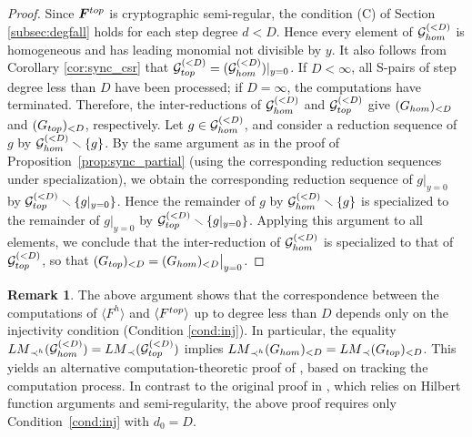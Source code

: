 \documentclass{article}
\theoremstyle{definition}
\newtheorem{remark}[theorem]{Remark}
\theoremstyle{plain}
\theoremstyle{plain}
\theoremstyle{plain}
\theoremstyle{plain}
\numberwithin{equation}{subsection}
\begin{document}
\begin{proof}
Since $\bm{F}^{\rm top}$ is cryptographic semi-regular, the condition (C) of Section \ref{subsec:degfall} holds for each step degree $d<D$.
Hence every element of $\mathcal{G}_{\rm hom}^{(<D)}$ is homogeneous and has leading monomial not divisible by $y$.
It also follows from Corollary \ref{cor:sync_csr} that $\mathcal G_{\rm top}^{(<D)}=(\mathcal G_{\rm hom}^{(<D)})|_{y=0}$.
If $D<\infty$, all S-pairs of step degree less than $D$ have been processed; if $D=\infty$, the computations have terminated.
Therefore, the inter-reductions of $\mathcal G_{\rm hom}^{(<D)}$ and $\mathcal G_{\rm top}^{(<D)}$ give $(G_{\rm hom})_{<D}$ and $(G_{\rm top})_{<D}$, respectively.
Let $g\in \mathcal{G}_{\rm hom}^{(<D)}$, and consider a reduction sequence of $g$ by $ \mathcal{G}_{\rm hom}^{(<D)} \smallsetminus \{ g\}$.
By the same argument as in the proof of Proposition~\ref{prop:sync_partial} (using the corresponding reduction sequences under specialization), we obtain the corresponding reduction sequence of $g|_{y=0}$ by $\mathcal{G}_{\rm top}^{(<D)}\smallsetminus\{g|_{y=0}\}$.
Hence the remainder of $g$ by $ \mathcal{G}_{\rm hom}^{(<D)} \smallsetminus\{g\}$ is specialized to the remainder of $g|_{y=0}$ by $\mathcal{G}_{\rm top}^{(<D)}\smallsetminus\{g|_{y=0}\}$.
Applying this argument to all elements, we conclude that the inter-reduction of $\mathcal{G}_{\rm hom}^{(<D)}$ is specialized to that of $\mathcal{G}_{\rm top}^{(<D)}$, so that $(G_{\rm top})_{<D}=(G_{\rm hom})_{<D}\big|_{y=0}$.
\end{proof}

\begin{remark}
The above argument shows that the correspondence between the computations of $\langle F^h\rangle$ and $\langle F^{\rm top}\rangle$ up to degree less than $D$ depends only on the injectivity condition (Condition \ref{cond:inj}).
In particular, the equality ${\rm LM}_{\prec^h}(\mathcal{G}_{\rm hom}^{(<D)})={\rm LM}_{\prec}(\mathcal{G}_{\rm top}^{(<D)})$ implies ${\rm LM}_{\prec^h}(G_{\rm hom})_{<D}={\rm LM}_{\prec}(G_{\rm top})_{<D}$.
This yields an alternative computation-theoretic proof of \cite[Lemma~2]{KY}, based on tracking the computation process.
In contrast to the original proof in \cite{KY}, which relies on Hilbert function arguments and semi-regularity, the above proof requires only Condition~\ref{cond:inj} with $d_0=D$.
\end{remark}

% 

\end{document}
